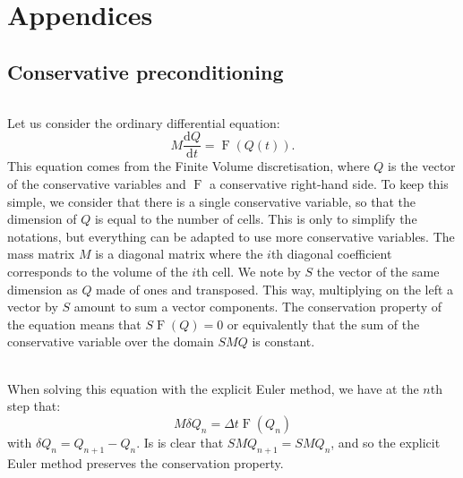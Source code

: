 \part*{Appendices}
\appendix

  \chapter{Conservative preconditioning}
  \label{appendix:conservative_preconditioning}

    \paragraph{}
    Let us consider the ordinary differential equation:
    \begin{equation}
      M \frac{\mathrm{d}Q}{\mathrm{d} t} = \operatorname{F}\left(Q\left(t\right)\right) .
    \end{equation}
    This equation comes from the Finite Volume discretisation, where $Q$ is the vector of the conservative variables and $\operatorname{F}$ a conservative right-hand side.
    To keep this simple, we consider that there is a single conservative variable, so that the dimension of $Q$ is equal to the number of cells.
    This is only to simplify the notations, but everything can be adapted to use more conservative variables.
    The mass matrix $M$ is a diagonal matrix where the $i$th diagonal coefficient corresponds to the volume of the $i$th cell.
    We note by $S$ the vector of the same dimension as $Q$ made of ones and transposed.
    This way, multiplying on the left a vector by $S$ amount to sum a vector components.
    The conservation property of the equation means that $S \operatorname{F}\left(Q\right) = 0$ or equivalently that the sum of the conservative variable over the domain $SMQ$ is constant.

    \paragraph{}
    When solving this equation with the explicit Euler method, we have at the $n$th step that:
    \begin{equation}
      M\delta Q_n = \Delta t \operatorname{F}\left(Q_n\right)
    \end{equation}
    with $\delta Q_n = Q_{n+1} - Q_n$.
    Is is clear that $SMQ_{n+1} = SMQ_n$, and so the explicit Euler method preserves the conservation property.

